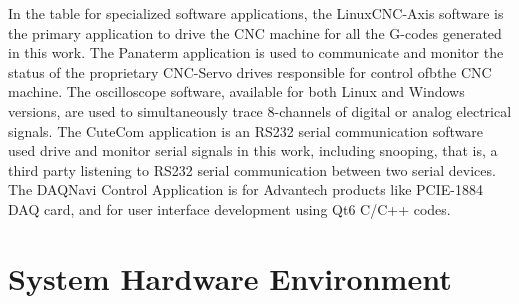 In the table for specialized software applications, the LinuxCNC-Axis software is the primary application to drive the CNC machine for all the G-codes generated in this work. The Panaterm application is used to communicate and monitor the status of the proprietary CNC-Servo drives responsible for control ofbthe CNC machine. The oscilloscope software, available for both Linux and Windows versions, are used to simultaneously trace 8-channels of digital or analog electrical signals. The CuteCom application is an RS232 serial communication software used drive and monitor serial signals in this work, including snooping, that is, a third party listening to RS232 serial communication between two serial devices. The DAQNavi Control Application is for Advantech products like PCIE-1884 DAQ card, and for user interface development using Qt6 C/C++ codes.\\    




\clearpage
\pagebreak

\section{System Hardware Environment}

